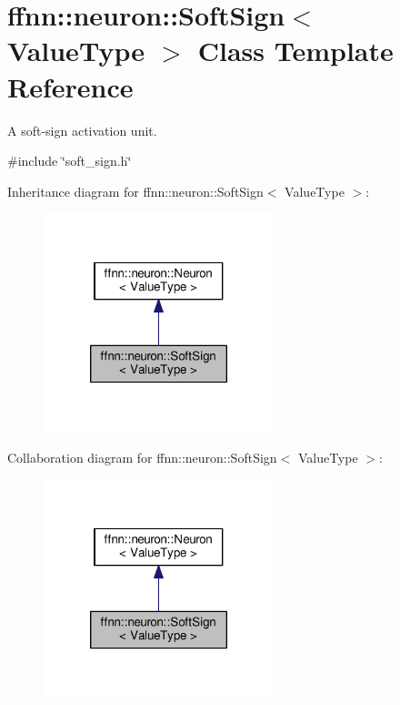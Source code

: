 \hypertarget{classffnn_1_1neuron_1_1_soft_sign}{\section{ffnn\-:\-:neuron\-:\-:Soft\-Sign$<$ Value\-Type $>$ Class Template Reference}
\label{classffnn_1_1neuron_1_1_soft_sign}
}


A soft-\/sign activation unit.  




{\ttfamily \#include \char`\"{}soft\-\_\-sign.\-h\char`\"{}}



Inheritance diagram for ffnn\-:\-:neuron\-:\-:Soft\-Sign$<$ Value\-Type $>$\-:\nopagebreak
\begin{figure}[H]
\begin{center}
\leavevmode
\includegraphics[width=190pt]{classffnn_1_1neuron_1_1_soft_sign__inherit__graph}
\end{center}
\end{figure}


Collaboration diagram for ffnn\-:\-:neuron\-:\-:Soft\-Sign$<$ Value\-Type $>$\-:\nopagebreak
\begin{figure}[H]
\begin{center}
\leavevmode
\includegraphics[width=190pt]{classffnn_1_1neuron_1_1_soft_sign__coll__graph}
\end{center}
\end{figure}
